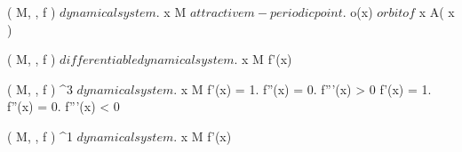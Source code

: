 \documentclass[../Main/main]{subfiles}
\begin{document}
{	
	{
		{
			( M, \N, f ) $ dynamical system $.
			x \in M $ attractive m-periodic point $.
			o(x) $ orbit of $ x
		}
		{
		}
		\denote
		{
			A( x )
		}
	}
	
	
	{
		{
			( M, \N, f ) $ differentiable dynamical system $.
			x \in M
		}
		{
			f'(x) \in {}
		}
	}


	{
		{
			( M, \N, f ) \; \Cc^3 $ dynamical system $.
			x \in M
		}
		{
			f'(x) = 1.
			f''(x) = 0.
			f'''(x) > 0
		}
		{
			f'(x) = 1.
			f''(x) = 0.
			f'''(x) < 0
		}
	}
	
	
	{
		{
			( M, \N, f ) \Cc^1 $ dynamical system $.
			x \in M
		}
		{
			f'(x)
		}
	}
	
	
	
	
	
	
	
	
	
	
	
	
	
	
	
	

}
\end{document}
